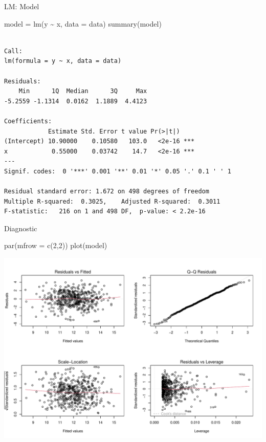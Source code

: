 \documentclass[
  ignorenonframetext,
]{beamer}
\newenvironment{Shaded}{\begin{snugshade}}{\end{snugshade}}
\newcommand{\AttributeTok}[1]{\textcolor[rgb]{0.00,0.34,0.68}{#1}}
\newcommand{\DecValTok}[1]{\textcolor[rgb]{0.69,0.50,0.00}{#1}}
\newcommand{\FunctionTok}[1]{\textcolor[rgb]{0.39,0.29,0.61}{#1}}
\newcommand{\NormalTok}[1]{\textcolor[rgb]{0.12,0.11,0.11}{#1}}
\newcommand{\OtherTok}[1]{\textcolor[rgb]{0.00,0.43,0.16}{#1}}
\newcommand{\SpecialCharTok}[1]{\textcolor[rgb]{0.24,0.68,0.91}{#1}}
\begin{document}
\begin{frame}[fragile]{LM: Model}
\protect\hypertarget{lm-model}{}
\scriptsize

\begin{Shaded}
\begin{Highlighting}[]
\NormalTok{model }\OtherTok{=} \FunctionTok{lm}\NormalTok{(y }\SpecialCharTok{\textasciitilde{}}\NormalTok{ x, }\AttributeTok{data =}\NormalTok{ data)}
\FunctionTok{summary}\NormalTok{(model)}
\end{Highlighting}
\end{Shaded}

\begin{verbatim}

Call:
lm(formula = y ~ x, data = data)

Residuals:
    Min      1Q  Median      3Q     Max 
-5.2559 -1.1314  0.0162  1.1889  4.4123 

Coefficients:
            Estimate Std. Error t value Pr(>|t|)    
(Intercept) 10.90000    0.10580   103.0   <2e-16 ***
x            0.55000    0.03742    14.7   <2e-16 ***
---
Signif. codes:  0 '***' 0.001 '**' 0.01 '*' 0.05 '.' 0.1 ' ' 1

Residual standard error: 1.672 on 498 degrees of freedom
Multiple R-squared:  0.3025,    Adjusted R-squared:  0.3011 
F-statistic:   216 on 1 and 498 DF,  p-value: < 2.2e-16
\end{verbatim}
\end{frame}

\begin{frame}[fragile]{Diagnostic}
\protect\hypertarget{diagnostic}{}
\begin{Shaded}
\begin{Highlighting}[]
\FunctionTok{par}\NormalTok{(}\AttributeTok{mfrow =} \FunctionTok{c}\NormalTok{(}\DecValTok{2}\NormalTok{,}\DecValTok{2}\NormalTok{))}
\FunctionTok{plot}\NormalTok{(model)}
\end{Highlighting}
\end{Shaded}

\begin{center}\includegraphics[width=0.7\linewidth]{Practice_files/figure-beamer/unnamed-chunk-101-1} \end{center}
\end{frame}
\end{document}
